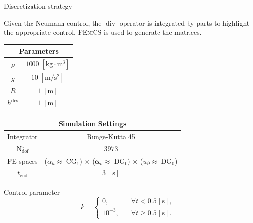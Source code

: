 \documentclass[aspectratio=169]{ISAE-Beamer}
\renewcommand{\div}{\operatorname{div}}
\newcommand{\fenics}{\textsc{FEniCS}\xspace}
\begin{document}
\begin{frame}{Discretization strategy}

Given the Neumann control, the $\div$ operator is integrated by parts to highlight the appropriate control. \fenics is used to generate the matrices.
\begin{table}[th]
	\centering
	\begin{tabular}{|c|c|}
		\hline 
		\multicolumn{2}{|c|}{Parameters} \\ 
		\hline 
		$\rho$ & $1000\; \mathrm{[kg \cdot m^3]}$ \\ 
		$g$& $10\; \mathrm{[m/s^2]}$ \\ 
		$R$& $1\; \mathrm{[m]}$\\ 
		$h^{\text{des}}$& $1\; \mathrm{[m]}$ \\ 
		\hline 
	\end{tabular} \hspace{.3cm}
	\begin{tabular}{|c|c|}
		\hline 
		\multicolumn{2}{|c|}{Simulation Settings} \\
		\hline 
		Integrator & Runge-Kutta 45 \\
		N$_{\text{dof}}^\circ$ & $3973$ \\
		FE spaces & ($\alpha_h\approx$ CG$_1$) $\times$ ($\bm{\alpha}_v\approx$ DG$_0$) $\times$ ($u_\partial\approx$ DG$_0$)\\
		$t_{\text{end}}$ & $3\; \mathrm{[s]}$\\ 
		\hline 
	\end{tabular} 
\end{table}
\vspace{.5cm}
Control parameter
\begin{equation*}
k = 
\begin{cases}
0, \quad &\forall t < 0.5 \, [\mathrm{s}], \\
10^{-3}, \quad &\forall t \ge 0.5 \, [\mathrm{s}].
\end{cases}
\end{equation*}
		
\end{frame}
\end{document}
